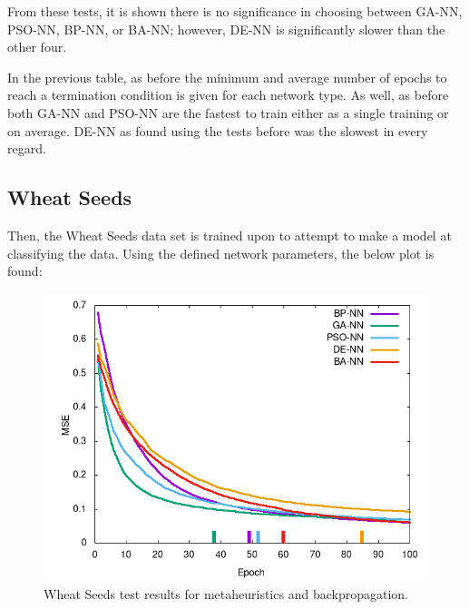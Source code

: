 \documentclass[a4paper,12pt]{article}
\begin{document}
From these tests, it is shown there is no significance in choosing between GA-NN, PSO-NN, BP-NN, or BA-NN; however, DE-NN is significantly slower than the other four.

\begin{table}[h!]
\centering
{}
\caption{Minimum and average time to terminate for Penguins data set.}
\label{Tab:penguins-min}
\end{table}

In the previous table, as before the minimum and average number of epochs to reach a termination condition is given for each network type. As well, as before both GA-NN and PSO-NN are the fastest to train either as a single training or on average. DE-NN as found using the tests before was the slowest in every regard.

\pagebreak

\subsection{Wheat Seeds}

Then, the Wheat Seeds data set is trained upon to attempt to make a model at classifying the data. Using the defined network parameters, the below plot is found:

\begin{figure}[h!]
\centering
\includegraphics[scale=0.60]{images/wheat-plot.png}
\caption{Wheat Seeds test results for metaheuristics and backpropagation.}
\label{fig:wheat}
\end{figure}
\end{document}
